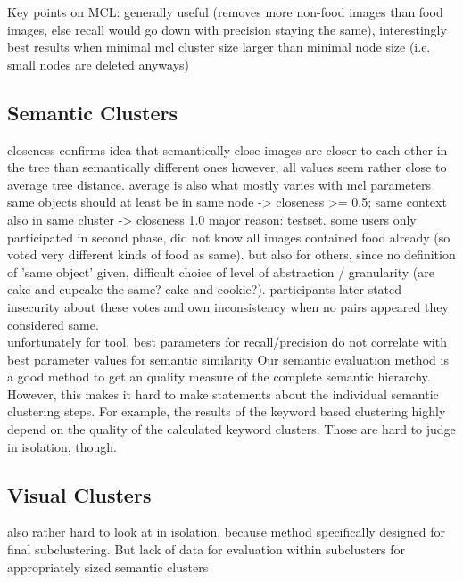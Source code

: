\bigskip
Key points on MCL: generally useful (removes more non-food images than food images, else recall would go down with precision staying the same), interestingly best results when minimal mcl cluster size larger than minimal node size (i.e. small nodes are deleted anyways)

\subsection{Semantic Clusters}
closeness confirms idea that semantically close images are closer to each other in the tree than semantically different ones
however, all values seem rather close to average tree distance. average is also what mostly varies with mcl parameters
same objects should at least be in same node -> closeness >= 0.5; same context also in same cluster -> closeness 1.0
major reason: testset. some  users only participated in second phase, did not know all images contained food already (so voted very different kinds of food as same). but also for others, since no definition of 'same object' given, difficult choice of level of abstraction / granularity (are cake and cupcake the same? cake and cookie?). participants later stated insecurity about these votes and own inconsistency when no pairs appeared they considered same.\\
unfortunately for tool, best parameters for recall/precision do not correlate with best parameter values for semantic similarity 
\bigskip
Our semantic evaluation method is a good method to get an quality measure of the complete semantic hierarchy. However, this makes it hard to make statements about the individual semantic clustering steps. For example, the results of the keyword based clustering highly depend on the quality of the calculated keyword clusters. Those are hard to judge in isolation, though.\\	


\subsection{Visual Clusters}
also rather hard to look at in isolation, because method specifically designed for final subclustering. But lack of data for evaluation within subclusters for appropriately sized semantic clusters
